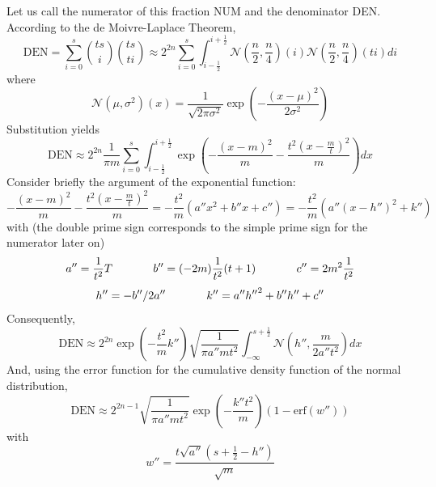 \documentclass[12pt]{article}
\newcommand{\erf}[0]{\mbox{erf}}
\newcommand{\aden}[0]{a''}
\newcommand{\bden}[0]{b''}
\newcommand{\cden}[0]{c''}
\newcommand{\hden}[0]{h''}
\newcommand{\kden}[0]{k''}
\newcommand{\wden}[0]{w''}
\begin{document}
Let us call the numerator of this fraction NUM and the denominator
DEN. According to the de Moivre-Laplace Theorem,
\begin{displaymath}
  \mbox{DEN}=\sum_{i=0}^{s}\binom{ts}{i}\binom{ts}{ti}\approx{}2^{2n}\sum_{i=0}^{s}\int_{i-\frac{1}{2}}^{i+\frac{1}{2}}\mathcal{N}(\frac{n}{2},\frac{n}{4})(i)\mathcal{N}(\frac{n}{2},\frac{n}{4})(ti)di
\end{displaymath}
where
\begin{displaymath}
  \mathcal{N}(\mu,\sigma^{2})(x)=\frac{1}{\sqrt{2\pi\sigma^{2}}}\exp\left(-\frac{(x-\mu)^{2}}{2\sigma^{2}}\right)
\end{displaymath}
Substitution yields
\begin{displaymath}
  \mbox{DEN}\approx{}2^{2n}\frac{1}{\pi{}m}\sum_{i=0}^{s}\int_{i-\frac{1}{2}}^{i+\frac{1}{2}}\exp\left(-\frac{\left(x-m\right)^{2}}{m}-\frac{t^{2}\left(x-\frac{m}{t}\right)^{2}}{m}\right)dx
\end{displaymath}
Consider briefly the argument of the exponential function:
\begin{displaymath}
  -\frac{\left(x-m\right)^{2}}{m}-\frac{t^{2}\left(x-\frac{m}{t}\right)^{2}}{m}=-\frac{t^{2}}{m}({\aden}x^{2}+{\bden}x+{\cden})=-\frac{t^{2}}{m}\left({\aden}(x-{\hden})^{2}+{\kden}\right)
\end{displaymath}
with (the double prime sign corresponds to the simple prime sign for
the numerator later on)
\begin{displaymath}
{\aden}=\frac{1}{t^{2}}{T}\notag\hspace{.5in}
{\bden}=(-2m)\frac{1}{t^{2}}(t+1)\hspace{.5in}
{\cden}=2m^{2}\frac{1}{t^{2}}
\end{displaymath}
\begin{displaymath}
{\hden}=-{\bden}/2{\aden}\hspace{.5in}
{\kden}={\aden}{\hden}^{2}+{\bden}{\hden}+{\cden}
\end{displaymath}
Consequently,
\begin{displaymath}
\mbox{DEN}\approx{}2^{2n}\exp\left(-\frac{t^{2}}{m}{\kden}\right)\sqrt{\frac{1}{\pi{}{\aden}mt^{2}}}\int_{-\infty}^{s+\frac{1}{2}}\mathcal{N}\left({\hden},\frac{m}{2{\aden}t^{2}}\right)dx
\end{displaymath}
And, using the error function for the cumulative density function of
the normal distribution,
\begin{equation}
  \label{eq:den}
  \mbox{DEN}\approx{}2^{2n-1}\sqrt{\frac{1}{\pi{}{\aden}mt^{2}}}\exp\left(-\frac{{\kden}t^{2}}{m}\right)\left(1-\erf({\wden})\right)
\end{equation}
with
\begin{displaymath}
  {\wden}=\frac{t\sqrt{{\aden}}\left(s+\frac{1}{2}-{\hden}\right)}{\sqrt{m}}
\end{displaymath}
\end{document}
